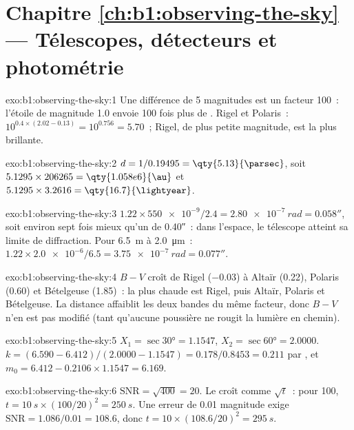 \section*{Chapitre \ref{ch:b1:observing-the-sky} --- Télescopes, détecteurs et photométrie}

\begin{solution}{exo:b1:observing-the-sky:1}
Une différence de 5 magnitudes est un facteur 100~: l'étoile de magnitude 1.0
envoie 100 fois plus de . Rigel et Polaris~: $10^{0.4\times(2.02 - 0.13)} =
10^{0.756} = 5.70$~; Rigel, de plus petite magnitude, est la plus brillante.
\end{solution}

\begin{solution}{exo:b1:observing-the-sky:2}
$d = 1/0.19495 = \qty{5.13}{\parsec}$, soit $5.1295\times206265 =
\qty{1.058e6}{\au}$ et $5.1295\times3.2616 = \qty{16.7}{\lightyear}$.
\end{solution}

\begin{solution}{exo:b1:observing-the-sky:3}
$1.22\times\num{550e-9}/2.4 = \qty{2.80e-7}{rad} = \ang{;;0.058}$, soit environ
sept fois mieux qu'un  de \ang{;;0.40}~: dans l'espace, le télescope
atteint sa limite de diffraction. Pour \qty{6.5}{m} à \qty{2.0}{\micro\metre}~:
$1.22\times\num{2.0e-6}/6.5 = \qty{3.75e-7}{rad} = \ang{;;0.077}$.
\end{solution}

\begin{solution}{exo:b1:observing-the-sky:4}
$B - V$ croît de Rigel ($-0.03$) à Altaïr (0.22), Polaris (0.60) et
Bételgeuse (1.85)~: la plus chaude est Rigel, puis Altaïr, Polaris et
Bételgeuse. La distance affaiblit les deux bandes du même facteur, donc $B - V$
n'en est pas modifié (tant qu'aucune poussière ne rougit la lumière en chemin).
\end{solution}

\begin{solution}{exo:b1:observing-the-sky:5}
$X_1 = \sec\ang{30} = 1.1547$, $X_2 = \sec\ang{60} = 2.0000$.
$k = (6.590 - 6.412)/(2.0000 - 1.1547) = 0.178/0.8453 = \num{0.211}$ par
, et $m_0 = 6.412 - 0.2106\times1.1547 = 6.169$.
\end{solution}

\begin{solution}{exo:b1:observing-the-sky:6}
$\mathrm{SNR} = \sqrt{400} = 20$. Le  croît comme
$\sqrt t$~: pour 100,
$t = \qty{10}{s}\times(100/20)^2 = \qty{250}{s}$. Une erreur de \num{0.01}
magnitude exige $\mathrm{SNR} = 1.086/0.01 = 108.6$, donc
$t = 10\times(108.6/20)^2 = \qty{295}{s}$.
\end{solution}

